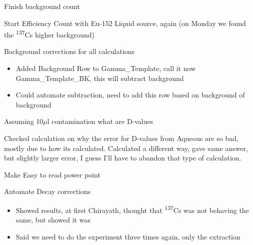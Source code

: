 \documentclass[idxtotoc,hyperref,openany,oneside]{labbook} %
\newcommand{\cmark}{\ding{51}}%
\newcommand{\done}{\rlap{$\square$}{\raisebox{2pt}{\large\hspace{1pt}\cmark}}%
  \hspace{-2.5pt}}
\newcommand{\tss}{\textsuperscript}
\begin{document}


\begin{todolist}
\item[\done]{Finish background count}
\item[\done]{Start Efficiency Count with Eu-152 Liquid source,
  again (on Monday we found the \tss{137}Cs higher
  background)}
\item[\done]{Background corrections for all calculations}
  \begin{itemize}
  \item{Added Background Row to Gamma\_Template,
    call it now Gamma\_Template\_BK, this will subtract
    background}
  \item{Could automate subtraction, need to
    add this row based on background of background}
  \end{itemize}
\item[\done]{Assuming 10$\mu$l contamination what are D-values}
\item[\done]{Checked calculation on why the error for
  D-values from Aqueous are so bad,
  mostly due to how its calculated. Calculated a different way,
  gave same answer, but slightly larger error, I guess I'll have
  to abandon that type of calculation.}
\item{Make Easy to read power point}
\item[\done]{Automate Decay corrections}
\end{todolist}

\begin{itemize}
\item{Showed results, at first Chirayath, thought that
  \tss{137}Cs was not behaving the same, but showed it was}
\item{Said we need to do the experiment three times again,
  only the extraction}
\end{itemize}




\end{document}
